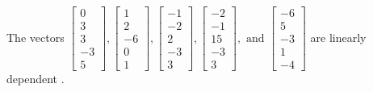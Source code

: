 \begin{exercise}
\begin{exerciseStatement}
  \end{exerciseStatement}
  \begin{exerciseAnswer}
   The vectors \(\left[\begin{array}{r}
0 \\
3 \\
3 \\
-3 \\
5
\end{array}\right] , \left[\begin{array}{r}
1 \\
2 \\
-6 \\
0 \\
1
\end{array}\right] , \left[\begin{array}{r}
-1 \\
-2 \\
2 \\
-3 \\
3
\end{array}\right] , \left[\begin{array}{r}
-2 \\
-1 \\
15 \\
-3 \\
3
\end{array}\right] , \text{ and } \left[\begin{array}{r}
-6 \\
5 \\
-3 \\
1 \\
-4
\end{array}\right]\) are 
  	 linearly dependent  .
  


  \end{exerciseAnswer}
\end{exercise}